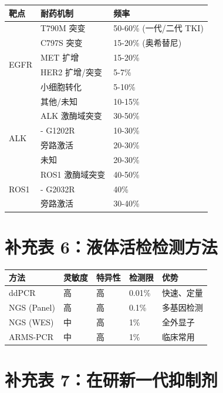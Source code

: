 \documentclass[12pt,a4paper]{article}
\begin{document}
\begin{table}[h]
\centering
\begin{tabular}{p{3cm}p{5cm}p{4cm}}
\toprule
\textbf{靶点} & \textbf{耐药机制} & \textbf{频率} \\
\midrule
\multirow{6}{*}{EGFR} & T790M 突变 & 50-60\% (一代/二代 TKI) \\
& C797S 突变 & 15-20\% (奥希替尼) \\
& MET 扩增 & 15-20\% \\
& HER2 扩增/突变 & 5-7\% \\
& 小细胞转化 & 5-10\% \\
& 其他/未知 & 10-15\% \\
\midrule
\multirow{4}{*}{ALK} & ALK 激酶域突变 & 30-50\% \\
& \quad - G1202R & 10-30\% \\
& 旁路激活 & 20-30\% \\
& 未知 & 20-30\% \\
\midrule
\multirow{3}{*}{ROS1} & ROS1 激酶域突变 & 40-50\% \\
& \quad - G2032R & 40\% \\
& 旁路激活 & 30-40\% \\
\bottomrule
\end{tabular}
\end{table}

\newpage

\section{补充表 6：液体活检检测方法}

\begin{table}[h]
\centering
\begin{tabular}{p{2.5cm}p{2.5cm}p{2.5cm}p{2.5cm}p{3cm}}
\toprule
\textbf{方法} & \textbf{灵敏度} & \textbf{特异性} & \textbf{检测限} & \textbf{优势} \\
\midrule
ddPCR & 高 & 高 & 0.01\% & 快速、定量 \\
NGS (Panel) & 高 & 高 & 0.1\% & 多基因检测 \\
NGS (WES) & 中 & 高 & 1\% & 全外显子 \\
ARMS-PCR & 中 & 高 & 1\% & 临床常用 \\
\bottomrule
\end{tabular}
\end{table}

\newpage

\section{补充表 7：在研新一代抑制剂}
\end{document}
